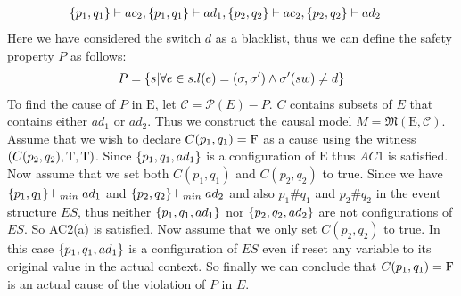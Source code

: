 \begin{example}
\begin{align*}
         & \{p_1,q_1\} \vdash ac_2, \{p_1,q_1\} \vdash ad_1,
        \{p_2,q_2\} \vdash ac_2, \{p_2,q_2\} \vdash ad_2
    \end{align*}
    Here we have considered the switch $d$ as a blacklist, thus we can define the
    safety property $P$ as follows:
    \begin{align*}
        P = \{s|\forall e \in s. l(e) = (\sigma,\sigma')\wedge \sigma'(sw) \neq d\}
    \end{align*}
    To find the cause of $P$ in $\mathrm{E}$, 
    let $\mathcal{C} = \mathcal{P}(E) - P$. 
    $C$ contains subsets of $E$ that contains either $ad_1$ or $ad_2$.
    Thus we construct the causal model $M = \mathfrak{M}(\mathrm{E},\mathcal{C})$.
    Assume that we wish to declare $C(p_1,q_1) = \mathrm{F}$ as a cause using the witness 
    $(C(p_2,q_2),\mathrm{T},\mathrm{T})$.
    Since $\{p_1,q_1,ad_1\}$ is a configuration of $\mathrm{E}$ thus 
    $AC1$ is satisfied.
    Now assume that we set both $C(p_1,q_1)$ and $C(p_2,q_2)$ to true.
    Since we have $\{p_1,q_1\} \vdash_{min} ad_1$ and
    $\{p_2,q_2\} \vdash_{min} ad_2$ and also $p_1\#q_1$ and $p_2\#q_2$ in the 
    event structure $ES$, thus neither $\{p_1,q_1,ad_1\}$ nor $\{p_2,q_2,ad_2\}$
    are not configurations of $ES$. 
    So AC2(a) is satisfied.
    Now assume that we only set $C(p_2,q_2)$ to true.
    In this case $\{p_1,q_1,ad_1\}$ is a configuration of $ES$ even if reset any 
    variable to its original value in the actual context. 
    So finally we can conclude that $C(p_1,q_1) = \mathrm{F}$ is an actual cause of the 
    violation of $P$ in $E$.
\end{example}